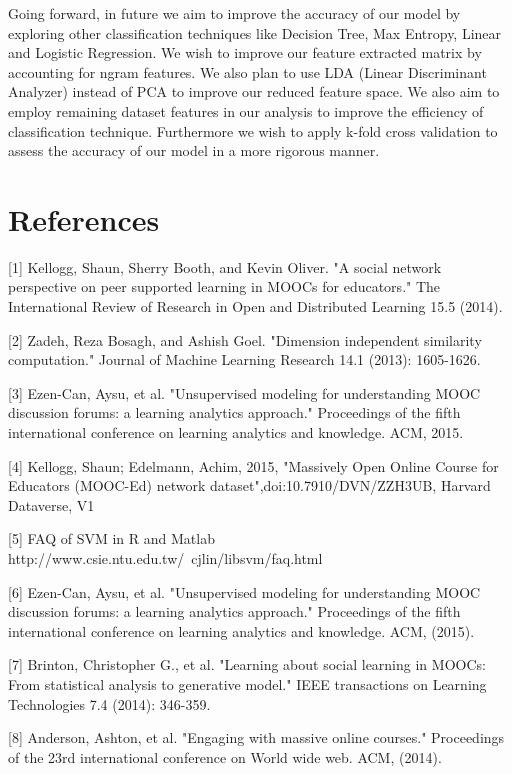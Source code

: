 \documentclass{article}
\begin{document}
Going forward, in future we aim to improve the accuracy of our model by exploring other classification techniques like Decision Tree, Max Entropy, Linear and Logistic Regression. We wish to improve our feature extracted matrix by accounting for ngram features. We also plan to use LDA (Linear Discriminant Analyzer) instead of PCA to improve our reduced feature space. We also aim to employ remaining dataset features in our analysis to improve the efficiency of classification technique. Furthermore we wish to apply k-fold cross validation to assess the accuracy of our model in a more rigorous manner.

\section*{References}   

\small

[1] Kellogg, Shaun, Sherry Booth, and Kevin Oliver. "A social network perspective on peer supported learning in MOOCs for educators." The International Review of Research in Open and Distributed Learning 15.5 (2014).

[2] Zadeh, Reza Bosagh, and Ashish Goel. "Dimension independent similarity computation." Journal of Machine Learning Research 14.1 (2013): 1605-1626.

[3] Ezen-Can, Aysu, et al. "Unsupervised modeling for understanding MOOC discussion forums: a learning analytics approach." Proceedings of the fifth international conference on learning analytics and knowledge. ACM, 2015.

[4] Kellogg, Shaun; Edelmann, Achim, 2015, "Massively Open Online Course for Educators (MOOC-Ed) network dataset",doi:10.7910/DVN/ZZH3UB, Harvard Dataverse, V1

[5] FAQ of SVM in R and Matlab http://www.csie.ntu.edu.tw/~cjlin/libsvm/faq.html

[6] Ezen-Can, Aysu, et al. "Unsupervised modeling for understanding MOOC discussion forums: a learning analytics approach." Proceedings of the fifth international conference on learning analytics and knowledge. ACM, (2015).

[7] Brinton, Christopher G., et al. "Learning about social learning in MOOCs: From statistical analysis to generative model." IEEE transactions on Learning Technologies 7.4 (2014): 346-359.

[8] Anderson, Ashton, et al. "Engaging with massive online courses." Proceedings of the 23rd international conference on World wide web. ACM, (2014).
\end{document}
